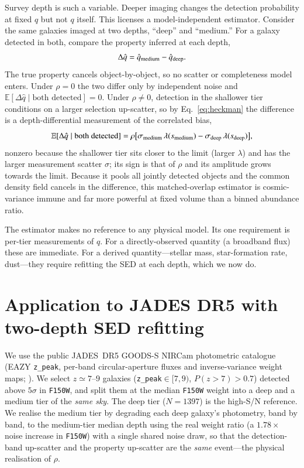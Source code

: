 \documentclass{aa}
\begin{document}
Survey depth is such a variable. Deeper imaging changes the detection probability at fixed $q$ but
not $q$ itself. This licenses a model-independent estimator. Consider the same galaxies imaged at
two depths, ``deep'' and ``medium.'' For a galaxy detected in both, compare the property inferred
at each depth,
\begin{equation}
\Delta\hat q=\hat q_{\rm medium}-\hat q_{\rm deep}.
\label{eq:matched}
\end{equation}
The true property cancels object-by-object, so no scatter or completeness model enters. Under
$\rho=0$ the two differ only by independent noise and $\mathbb{E}[\Delta\hat q\mid\text{both
detected}]=0$. Under $\rho\neq0$, detection in the shallower tier conditions on a larger selection
up-scatter, so by Eq.~\eqref{eq:heckman} the difference is a depth-differential measurement of the
correlated bias,
\begin{equation}
\mathbb{E}[\Delta\hat q\mid\text{both detected}]
=\rho\big[\sigma_{\rm medium}\,\lambda(s_{\rm medium})-\sigma_{\rm deep}\,\lambda(s_{\rm deep})\big],
\label{eq:diff}
\end{equation}
nonzero because the shallower tier sits closer to the limit (larger $\lambda$) and has the larger
measurement scatter $\sigma$; its sign is that of $\rho$ and its amplitude grows towards the limit.
Because it pools all jointly detected objects and the common density field cancels in the
difference, this matched-overlap estimator is cosmic-variance immune and far more powerful at fixed
volume than a binned abundance ratio.

The estimator makes no reference to any physical model. Its one requirement is per-tier
measurements of $q$. For a directly-observed quantity (a broadband flux) these are immediate. For
a derived quantity---stellar mass, star-formation rate, dust---they require refitting the SED at
each depth, which we now do.

\section{Application to JADES DR5 with two-depth SED refitting}
\label{sec:data}

We use the public JADES~DR5 GOODS-S NIRCam photometric catalogue (EAZY \texttt{z\_peak}, per-band
circular-aperture fluxes and inverse-variance weight maps; \citealt{Eisenstein2023}). We select
$z\simeq7$--$9$ galaxies (\texttt{z\_peak}$\in[7,9)$, $P(z>7)>0.7$) detected above $5\sigma$ in
\texttt{F150W}, and split them at the median \texttt{F150W} weight into a deep and a medium tier
of the \emph{same sky}. The deep tier ($N=1397$) is the high-S/N reference. We realise the medium
tier by degrading each deep galaxy's photometry, band by band, to the medium-tier median depth
using the real weight ratio (a $1.78\times$ noise increase in \texttt{F150W}) with a single shared
noise draw, so that the detection-band up-scatter and the property up-scatter are the \emph{same}
event---the physical realisation of $\rho$.
\end{document}
